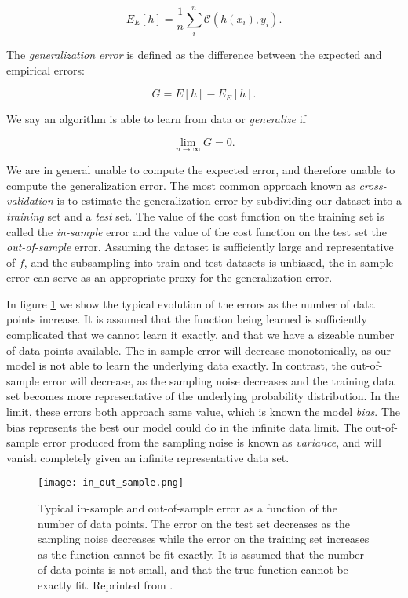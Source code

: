 \begin{equation}
 E_E[h] = \frac{1}{n} \sum_i^n \mathcal{C}(h(x_i), y_i) .
\end{equation}

The \textit{generalization error} is defined as the difference
between the expected and empirical errors:

\begin{equation}
 G = E[h] - E_E[h] .
\end{equation}

We say an algorithm is able to learn from data or \textit{generalize} if 

\begin{equation}
 \lim_{n\to\infty} G = 0 .
\end{equation}

We are in general unable to compute the expected error, and therefore unable
to compute the generalization error. The most common approach known as
\textit{cross-validation} is to estimate the
generalization error by subdividing our dataset into a \textit{training} set
and a \textit{test} set. The value of the cost function on the training set
is called the \textit{in-sample} error and the value of the cost
function on the test set the \textit{out-of-sample} error.
Assuming the dataset is sufficiently large and representative of $f$,
and the subsampling into train and test datasets is unbiased, the in-sample error
can serve as an appropriate proxy for the generalization error.
\par
In figure \ref{fig:in-out}
we show the typical evolution of the errors as the number of data points increase.
It is assumed that the function being learned is sufficiently complicated
that we cannot learn it exactly, and that we have a sizeable number of data points
available. The in-sample error will decrease monotonically, as our model
is not able to learn the underlying data exactly. In contrast, the out-of-sample
error will decrease, as the sampling noise decreases and the training
data set becomes more representative of the underlying probability distribution.
In the limit, these errors both approach same value, which is known the model
\textit{bias}. The bias represents the best our model could do in the infinite data limit.
The out-of-sample error produced from the sampling noise
is known as \textit{variance}, and will vanish completely
given an infinite representative data set.

\begin{figure}[H]
    \centering
    \texttt{[image: in\_out\_sample.png]}
    \caption{Typical in-sample and out-of-sample error as a function
    of the number of data points. The error on the test set decreases
    as the sampling noise decreases while the error on the training set
    increases as the function cannot be fit exactly. It is assumed that the number
    of data points is not small, and that the true function
    cannot be exactly fit. Reprinted from \parencite[Mehta et al. page 11]{
        mehta2019high}.}
    \label{fig:in-out}
\end{figure}

